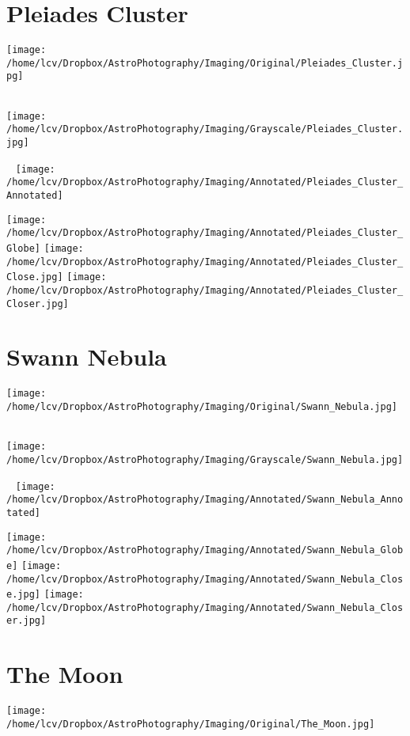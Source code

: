 \section{Pleiades Cluster}
\texttt{[image: /home/lcv/Dropbox/AstroPhotography/Imaging/Original/Pleiades\_Cluster.jpg]}
{\footnotesize\color{white}

}\ \\
\texttt{[image: /home/lcv/Dropbox/AstroPhotography/Imaging/Grayscale/Pleiades\_Cluster.jpg]}
\begin{center}
 \ \newpage
\texttt{[image: /home/lcv/Dropbox/AstroPhotography/Imaging/Annotated/Pleiades\_Cluster\_Annotated]}

\texttt{[image: /home/lcv/Dropbox/AstroPhotography/Imaging/Annotated/Pleiades\_Cluster\_Globe]}
\texttt{[image: /home/lcv/Dropbox/AstroPhotography/Imaging/Annotated/Pleiades\_Cluster\_Close.jpg]}
\texttt{[image: /home/lcv/Dropbox/AstroPhotography/Imaging/Annotated/Pleiades\_Cluster\_Closer.jpg]}
\end{center}
\section{Swann Nebula}
\texttt{[image: /home/lcv/Dropbox/AstroPhotography/Imaging/Original/Swann\_Nebula.jpg]}
{\footnotesize\color{white}

}\ \\
\texttt{[image: /home/lcv/Dropbox/AstroPhotography/Imaging/Grayscale/Swann\_Nebula.jpg]}
\begin{center}
 \ \newpage
\texttt{[image: /home/lcv/Dropbox/AstroPhotography/Imaging/Annotated/Swann\_Nebula\_Annotated]}

\texttt{[image: /home/lcv/Dropbox/AstroPhotography/Imaging/Annotated/Swann\_Nebula\_Globe]}
\texttt{[image: /home/lcv/Dropbox/AstroPhotography/Imaging/Annotated/Swann\_Nebula\_Close.jpg]}
\texttt{[image: /home/lcv/Dropbox/AstroPhotography/Imaging/Annotated/Swann\_Nebula\_Closer.jpg]}
\end{center}
\section{The Moon}
\texttt{[image: /home/lcv/Dropbox/AstroPhotography/Imaging/Original/The\_Moon.jpg]}
{\footnotesize\color{white}

}\ \\
\begin{center}
\end{center}
